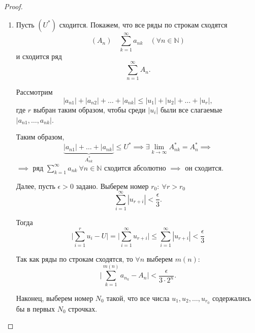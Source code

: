 \documentclass{report}
\theoremstyle{definition}
\begin{document}
\begin{proof}
  \begin{enumerate}
    \item Пусть $(U^*)$ сходится. Покажем, что все ряды по строкам сходятся
          \begin{equation*}
            (A_n) \quad \sum_{k=1}^{\infty}a_{nk} \quad (\forall n \in \mathbb{N})
          \end{equation*}
          и сходится ряд
          \begin{equation*}
            \sum_{n=1}^{\infty}A_n.
          \end{equation*}

          Рассмотрим
          \begin{equation*}
            |a_{n1}| + |a_{n2}| + \ldots + |a_{nk}| \leqslant |u_1| + |u_2| + \ldots + |u_r|,
          \end{equation*}
          где $r$ выбран таким образом, чтобы среди $|u_i|$ были все слагаемые $|a_{n1}, \ldots, a_{nk}|$.

          Таким образом,
          \begin{equation*}
            \underbrace{|a_{n1}| + \ldots + |a_{nk}|}_{A_{nk}^*} \leqslant U^* \implies \exists \underset{k\rightarrow\infty}{\lim}A_{nk}^* = A_n^* \implies
          \end{equation*}
          $\implies$ ряд $\sum_{k=1}^{\infty}a_{nk} \ \forall n \in \mathbb{N}$ сходится абсолютно $\implies$ он сходится.

          Далее, пусть $\epsilon > 0$ задано. Выберем номер $r_0: \ \forall r > r_0$
          \begin{equation*}
            \sum_{i=1}^{\infty}|u_{r+i}| < \frac{\epsilon}{3}.
          \end{equation*}

          Тогда
          \begin{equation*}
            \bigg|\sum_{i=1}^{r} u_i - U\bigg| = \bigg| \sum_{i=1}^{\infty}u_{r + i}\bigg| \leqslant \sum_{i=1}^{\infty}|u_{r + i}| < \frac{\epsilon}{3}
          \end{equation*}

          Так как ряды по строкам сходятся, то $\forall n$ выберем $m(n)$:
          \begin{equation*}
            \bigg|\sum_{k=1}^{m(n)}a_{n_k} - A_n\bigg| < \frac{\epsilon}{3 \cdot 2^n}.
          \end{equation*}

          Наконец, выберем номер $N_0$ такой, что все числа $u_1, u_2,\ldots, u_{r_0}$ содержались бы в первых $N_0$ строчках.


\end{enumerate}
\end{proof}
\end{document}
